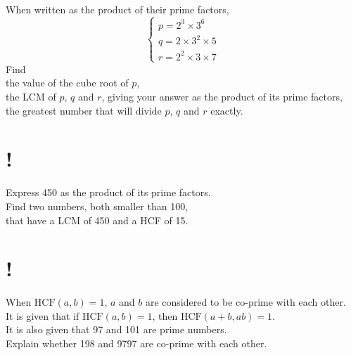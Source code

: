 \documentclass[12pt,a4paper]{article}
\begin{document}
\section{}
When written as the product of their prime factors,\\
\[\begin{cases}
    p=2^3\times3^6\\
    q=2\times3^2\times5\\
    r=2^2\times3\times7
\end{cases}\]
Find\\
the value of the cube root of \(p\),\\
the LCM of \(p\), \(q\) and \(r\), giving your answer as the product of its prime factors,\\
the greatest number that will divide \(p\), \(q\) and \(r\) exactly.

\section{!}
Express 450 as the product of its prime factors.\\
Find two numbers, both smaller than 100,\\
that have a LCM of 450 and a HCF of 15.

\section{!}
When \(\text{HCF}(a,b)=1\), \(a\) and \(b\) are considered to be co-prime with each other.\\
It is given that if \(\text{HCF}(a,b)=1\), then \(\text{HCF}(a+b,ab)=1\).\\
It is also given that 97 and 101 are prime numbers.\\
Explain whether 198 and 9797 are co-prime with each other.
\end{document}
